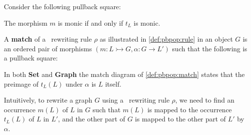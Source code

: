 \documentclass{book}
\begin{document}
    \begin{proposition}
      Consider the following pullback square:


      The morphism \(m\) is monic if and only if $t_L$ is monic.
    \end{proposition}

    \begin{definition}[Match]
      \label{def:pbpop:match}
      A \textbf{match} of a \pbpop~rewriting rule \(\rho\) as illustrated in \autoref{def:pbpop:rule} in an object \(G\) is an ordered pair of morphisms \((m:L \rightarrowtail G, \alpha: G \rightarrow L')\) such that the following is a pullback square:
    

      \end{definition}
    
\begin{remark}
In both \textbf{Set} and \textbf{Graph} the match diagram of \autoref{def:pbpop:match} states that the preimage of $t_L(L)$ under $\alpha$ is $L$ itself. 
\end{remark}
Intuitively, to rewrite a graph \(G\) using a \pbpop~rewriting rule \(\rho\), we need to find an occurrence $m(L)$ of \(L\) in \(G\) such that $m(L)$ is mapped to the occurrence $t_L(L)$ of $L$ in \(L'\), and the other part of \(G\) is mapped to the other part of \(L'\) by \(\alpha\).
\end{document}
